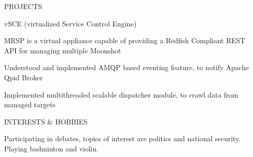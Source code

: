 \documentclass{resume} %
\begin{document}
\begin{rSection}{PROJECTS}
\begin{rSubsection}{vSCE (virtualized Service Control Engine)}
\vspace{-3pt}

\item MRSP is a virtual appliance capable of providing a Redfish Compliant REST API for managing multiple Moonshot
\item Understood and implemented AMQP based eventing feature, to notify Apache Qpid Broker
\item Implemented multithreaded scalable dispatcher module, to crawl data from managed targets

\end{rSubsection}




\end{rSection} 

\vspace{-10pt}
\begin{rSection}{INTERESTS \& HOBBIES} \itemsep -1pt  

\begin{rSubsection}{}{ }{}    

\vspace{-8pt}

\item Participating in debates, topics of interest are politics and national security. Playing badminton and violin.

\end{rSubsection} 


\end{rSection}  


  
\end{document}

